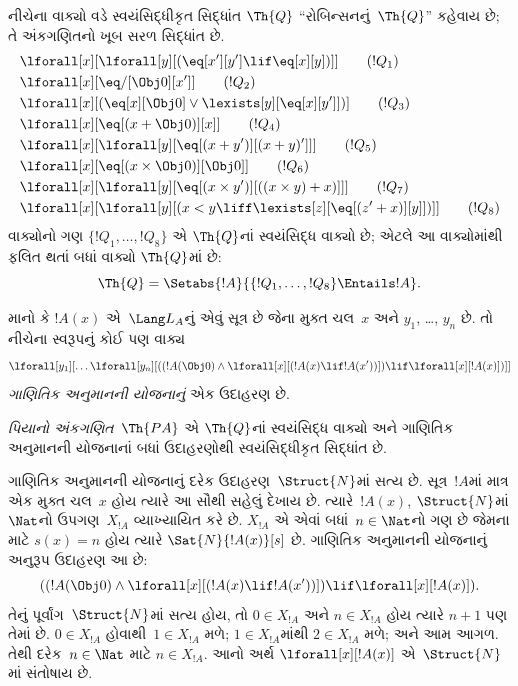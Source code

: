 \begin{defn}
નીચેના વાક્યો વડે સ્વયંસિદ્ધીકૃત સિદ્ધાંત
$\Th{Q}$ ``રોબિન્સનનું~$\Th{Q}$'' કહેવાય છે;
તે અંકગણિતનો ખૂબ સરળ સિદ્ધાંત છે.
\begin{align*}
& \lforall[x][\lforall[y][(\eq[x'][y'] \lif \eq[x][y])]] \tag{$!Q_1$}\\
& \lforall[x][\eq/[\Obj 0][x']] \tag{$!Q_2$}\\
& \lforall[x][(\eq[x][\Obj 0] \lor \lexists[y][\eq[x][y']])] \tag{$!Q_3$}\\
& \lforall[x][\eq[(x + \Obj 0)][x]] \tag{$!Q_4$}\\
& \lforall[x][\lforall[y][\eq[(x + y')][(x + y)']]] \tag{$!Q_5$}\\
& \lforall[x][\eq[(x \times \Obj 0)][\Obj 0]] \tag{$!Q_6$}\\
& \lforall[x][\lforall[y][\eq[(x \times y')][((x \times y) + x)]]] \tag{$!Q_7$}\\
& \lforall[x][\lforall[y][(x < y \liff \lexists[z][\eq[(z' + x)][y]])]] \tag{$!Q_8$}
\end{align*}
વાક્યોનો ગણ $\{!Q_1, \dots, !Q_8\}$ એ
$\Th{Q}$નાં સ્વયંસિદ્ધ વાક્યો છે; એટલે આ
વાક્યોમાંથી ફલિત થતાં બધાં વાક્યો
$\Th{Q}$માં છે:
\[
\Th{Q} = \Setabs{!A}{\{!Q_1, \dots, !Q_8\} \Entails !A}.
\]
\end{defn}

\begin{defn}
માનો કે $!A(x)$ એ~$\Lang L_A$નું એવું
સૂત્ર છે જેના મુક્ત ચલ~$x$ અને
$y_1$, \dots, $y_n$ છે. તો નીચેના સ્વરૂપનું
કોઈ પણ વાક્ય
\[
\lforall[y_1][\dots\lforall[y_n][((!A(\Obj 0) \land \lforall[x][(!A(x)
\lif !A(x'))]) \lif \lforall[x][!A(x)])]]
\]
\emph{ગાણિતિક અનુમાનની યોજનાનું} એક ઉદાહરણ છે.

\emph{પિયાનો અંકગણિત}~$\Th{PA}$ એ
$\Th{Q}$નાં સ્વયંસિદ્ધ વાક્યો અને ગાણિતિક અનુમાનની
યોજનાનાં બધાં ઉદાહરણોથી સ્વયંસિદ્ધીકૃત
સિદ્ધાંત છે.
\end{defn}

\begin{explain}
ગાણિતિક અનુમાનની યોજનાનું દરેક ઉદાહરણ~$\Struct{N}$માં
સત્ય છે. સૂત્ર~$!A$માં માત્ર એક મુક્ત
ચલ~$x$ હોય ત્યારે આ સૌથી સહેલું
દેખાય છે. ત્યારે~$!A(x)$, $\Struct{N}$માં
$\Nat$નો ઉપગણ~$X_{!A}$ વ્યાખ્યાયિત કરે છે.
$X_{!A}$ એ એવાં બધાં~$n \in \Nat$નો ગણ છે
જેમના માટે $s(x)=n$ હોય ત્યારે
$\Sat{N}{!A(x)}[s]$ છે. ગાણિતિક અનુમાનની યોજનાનું
અનુરૂપ ઉદાહરણ આ છે:
\[
((!A(\Obj 0) \land \lforall[x][(!A(x) \lif !A(x'))]) \lif 
  \lforall[x][!A(x)]).
\]
તેનું પૂર્વાંગ~$\Struct{N}$માં સત્ય હોય,
તો $0 \in X_{!A}$ અને $n \in X_{!A}$ હોય
ત્યારે $n+1$ પણ તેમાં છે. $0 \in X_{!A}$
હોવાથી~$1 \in X_{!A}$ મળે; $1 \in X_{!A}$માંથી
$2 \in X_{!A}$ મળે; અને આમ આગળ.
તેથી દરેક~$n \in \Nat$ માટે
$n \in X_{!A}$. આનો અર્થ
$\lforall[x][!A(x)]$ એ~$\Struct{N}$માં
સંતોષાય છે.
\end{explain}

